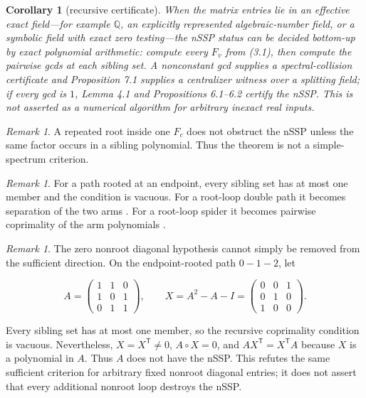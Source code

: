 \documentclass[11pt]{article}
\newtheorem{corollary}[theorem]{Corollary}
\theoremstyle{remark}
\newtheorem{remark}[theorem]{Remark}
\begin{document}
\begin{corollary}[recursive certificate]

When the matrix entries lie in an effective exact field---for example $\mathbb Q$, an explicitly represented algebraic-number field, or a symbolic field with exact zero testing---the nSSP status can be decided bottom-up by exact polynomial arithmetic: compute every $F_v$ from (3.1), then compute the pairwise gcds at each sibling set. A nonconstant gcd supplies a spectral-collision certificate and Proposition 7.1 supplies a centralizer witness over a splitting field; if every gcd is $1$, Lemma 4.1 and Propositions 6.1--6.2 certify the nSSP. This is not asserted as a numerical algorithm for arbitrary inexact real inputs.

\end{corollary}

\begin{remark}

A repeated root inside one $F_c$ does not obstruct the nSSP unless the same factor occurs in a sibling polynomial. Thus the theorem is not a simple-spectrum criterion.

\end{remark}

\begin{remark}

For a path rooted at an endpoint, every sibling set has at most one member and the condition is vacuous. For a root-loop double path it becomes separation of the two arms \cite{ref12}. For a root-loop spider it becomes pairwise coprimality of the arm polynomials \cite{ref7}.

\end{remark}

\begin{remark}

The zero nonroot diagonal hypothesis cannot simply be removed from the sufficient direction. On the endpoint-rooted path $0-1-2$, let

\[
A=
\begin{pmatrix}
1&1&0\\
1&0&1\\
0&1&1
\end{pmatrix},
\qquad
X=A^2-A-I=
\begin{pmatrix}
0&0&1\\
0&1&0\\
1&0&0
\end{pmatrix}.
\]

Every sibling set has at most one member, so the recursive coprimality condition is vacuous. Nevertheless, $X=X^{\mathsf T}\ne0$, $A\circ X=0$, and $AX^{\mathsf T}=X^{\mathsf T}A$ because $X$ is a polynomial in $A$. Thus $A$ does not have the nSSP. This refutes the same sufficient criterion for arbitrary fixed nonroot diagonal entries; it does not assert that every additional nonroot loop destroys the nSSP.

\end{remark}
\end{document}
